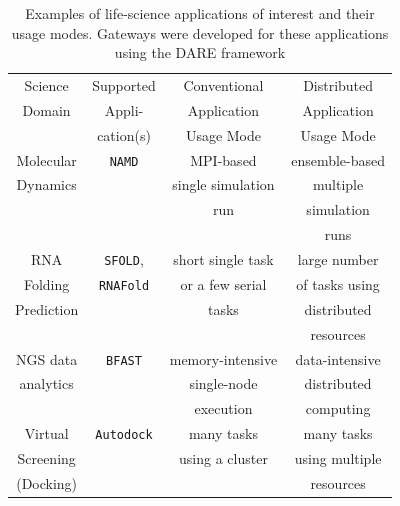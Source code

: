 \documentclass[]{svjour3}
\begin{document}


\begin{table}
\centering
 \small
\begin{tabular}{|c|c|c|c|} 
  \hline Science  & Supported  & Conventional   &   Distributed
  \\
  Domain & Appli- & Application & Application \\ 
  &  cation(s) & Usage Mode & Usage Mode \\  \hline \hline 
  
  Molecular   &  \texttt{NAMD} &  MPI-based  & ensemble-based   \\
  Dynamics  &  & single simulation  & multiple  \\ 
  &  & run &  simulation  \\ 
  &  &  &  runs \\ \hline
  RNA   & \texttt{SFOLD}, & short single task    & large number  \\
  Folding   & \texttt{RNAFold} & or a few serial & of tasks using   \\
  Prediction & &  tasks &distributed \\
  &  &  &   resources  \\ \hline
  NGS data     &  \texttt{BFAST} & memory-intensive  & data-intensive\\ 
  analytics  &  &  single-node   &  distributed  \\
  & & execution  & computing \\ \hline
  Virtual  & \texttt{Autodock} &  many tasks   & many tasks \\
  Screening  &  & using a cluster  & using multiple  \\
  (Docking) &  &  & resources \\ \hline
  \hline
\end{tabular} \caption{Examples of life-science applications of
  interest and their usage modes.  Gateways were developed for these
  applications using the DARE framework }
 \label{table:four-applications} 
\end{table}

\end{document}
